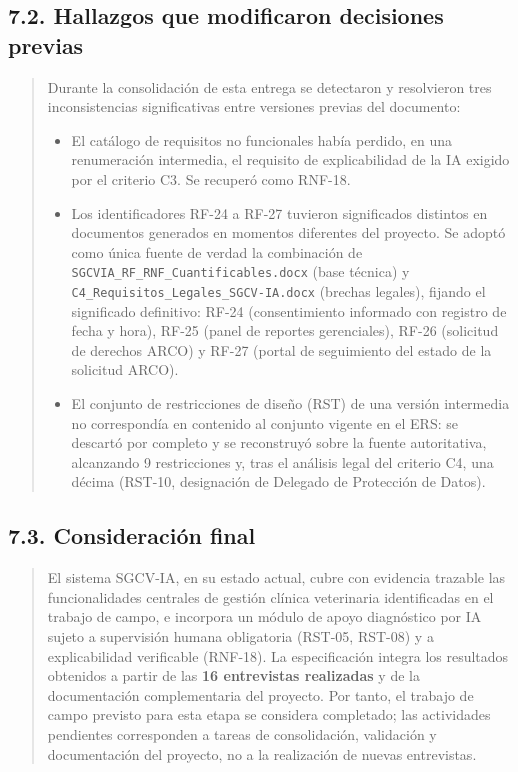 \documentclass[
]{article}
\begin{document}
\subsection{7.2. Hallazgos que modificaron decisiones
previas}\label{s7-2-hallazgos-que-modificaron-decisiones-previas}
\begin{quote}
Durante la consolidación de esta entrega se detectaron y resolvieron
tres inconsistencias significativas entre versiones previas del
documento:
\begin{itemize}
  \item El catálogo de requisitos no funcionales había perdido, en una
  renumeración intermedia, el requisito de explicabilidad de la IA
  exigido por el criterio C3. Se recuperó como RNF-18.
  \item Los identificadores RF-24 a RF-27 tuvieron significados
  distintos en documentos generados en momentos diferentes del
  proyecto. Se adoptó como única fuente de verdad la combinación de
  \texttt{SGCVIA\_RF\_RNF\_Cuantificables.docx} (base técnica) y
  \texttt{C4\_Requisitos\_Legales\_SGCV-IA.docx} (brechas legales),
  fijando el significado definitivo: RF-24 (consentimiento informado
  con registro de fecha y hora), RF-25 (panel de reportes gerenciales),
  RF-26 (solicitud de derechos ARCO) y RF-27 (portal de seguimiento del
  estado de la solicitud ARCO).
  \item El conjunto de restricciones de diseño (RST) de una versión
  intermedia no correspondía en contenido al conjunto vigente en el
  ERS: se descartó por completo y se reconstruyó sobre la fuente
  autoritativa, alcanzando 9 restricciones y, tras el análisis legal
  del criterio C4, una décima (RST-10, designación de Delegado de
  Protección de Datos).
\end{itemize}
\end{quote}
\subsection{7.3. Consideración final}\label{s7-6-consideracion-final}
\begin{quote}
El sistema SGCV-IA, en su estado actual, cubre con evidencia trazable
las funcionalidades centrales de gestión clínica veterinaria
identificadas en el trabajo de campo, e incorpora un módulo de apoyo
diagnóstico por IA sujeto a supervisión humana obligatoria (RST-05,
RST-08) y a explicabilidad verificable (RNF-18). La especificación integra los resultados obtenidos a partir de las
\textbf{16 entrevistas realizadas} y de la documentación complementaria
del proyecto. Por tanto, el trabajo de campo previsto para esta etapa
se considera completado; las actividades pendientes corresponden a
tareas de consolidación, validación y documentación del proyecto, no a
la realización de nuevas entrevistas.
\end{quote}
\end{document}
